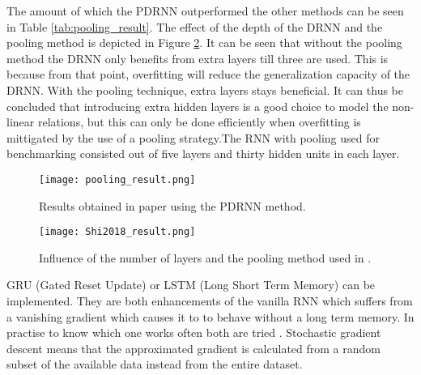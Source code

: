 The amount of which the PDRNN outperformed the other methods can be seen in Table \ref{tab:pooling_result}. The effect of the depth of the DRNN and the pooling method is depicted in Figure \ref{fig:Shi2018_result}. It can be seen that without the pooling method the DRNN only benefits from extra layers till three are used. This is because from that point, overfitting will reduce the generalization capacity of the DRNN. With the pooling technique, extra layers stays beneficial. It can thus be concluded that introducing extra hidden layers is a good choice to model the non-linear relations, but this can only be done efficiently when overfitting is mittigated by the use of a pooling strategy.The RNN with pooling used for benchmarking consisted out of five layers and thirty hidden units in each layer.

\begin{figure}[h!]
	\centering
	\texttt{[image: pooling\_result.png]}
	\caption{Results obtained in paper \cite{Shi2018} using the PDRNN method.}
	\label{fig:Shi2018_result}
\end{figure}

\begin{figure}[h!]
	\centering
	\texttt{[image: Shi2018\_result.png]}
	\caption{Influence of the number of layers and the pooling method used in \cite{Shi2018}.}
	\label{fig:Shi2018_result}
\end{figure}

GRU (Gated Reset Update) or LSTM (Long Short Term Memory) can be implemented. They are both enhancements of the vanilla RNN which suffers from a vanishing gradient which causes it to to behave without a long term memory. In practise to know which one works often both are tried \cite{Teuwen2019}. Stochastic gradient descent means that the approximated gradient is calculated from a random subset of the available data instead from the entire dataset. \\

